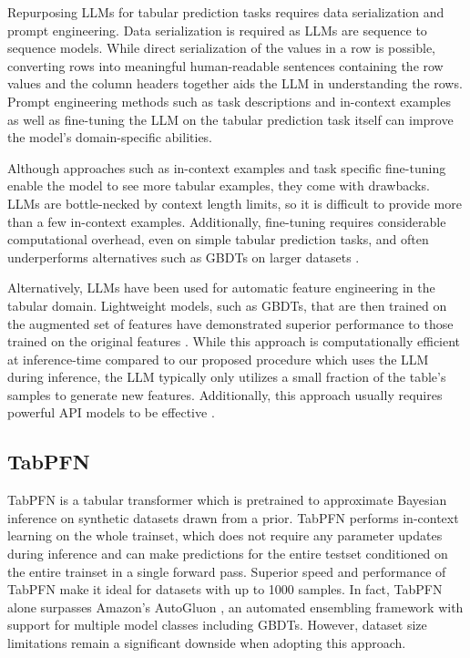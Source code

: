 Repurposing LLMs for tabular prediction tasks requires data serialization and prompt engineering. Data serialization is required as LLMs are sequence to sequence models. While direct serialization of the values in a row is possible, converting rows into meaningful human-readable sentences containing the row values and the column headers together aids the LLM in understanding the rows. Prompt engineering methods such as task descriptions and in-context examples as well as fine-tuning the LLM on the tabular prediction task itself can improve the model's domain-specific abilities. 

Although approaches such as in-context examples and task specific fine-tuning enable the model to see more tabular examples, they come with drawbacks. LLMs are bottle-necked by context length limits, so it is difficult to provide more than a few in-context examples. Additionally, fine-tuning requires considerable computational overhead, even on simple tabular prediction tasks, and often underperforms alternatives such as GBDTs on larger datasets \citep{dinh2022lift,hegselmann2023tabllm}.

Alternatively, LLMs have been used for automatic feature engineering in the tabular domain. Lightweight models, such as GBDTs, that are then trained on the augmented set of features have demonstrated superior performance to those trained on the original features \cite{NEURIPS2023_caafe, nam2024optimizedfeaturegenerationtabular}. While this approach is computationally efficient at inference-time compared to our proposed procedure which uses the LLM during inference, the LLM typically only utilizes a small fraction of the table's samples to generate new features. Additionally, this approach usually requires powerful API models to be effective \cite{NEURIPS2023_caafe}.

\subsection{TabPFN}
TabPFN \citep{hollmann2023tabpfn} is a tabular transformer which is pretrained to approximate Bayesian inference on synthetic datasets drawn from a prior. TabPFN performs in-context learning on the whole trainset, which does not require any parameter updates during inference and can make predictions for the entire testset conditioned on the entire trainset in a single forward pass. Superior speed and performance of TabPFN make it ideal for datasets with up to 1000 samples. In fact, TabPFN alone surpasses Amazon's AutoGluon \citep{agtabular}, an automated ensembling framework with support for multiple model classes including GBDTs. However, dataset size limitations remain a significant downside when adopting this approach.

